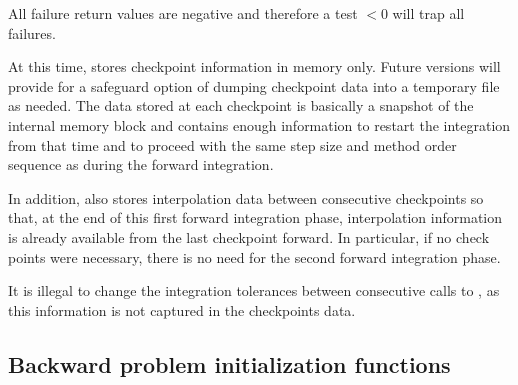 {
  All failure return values are negative and therefore a test $< 0$
  will trap all  failures.

  At this time,  stores checkpoint information in memory
  only. Future versions will provide for a safeguard option of dumping checkpoint
  data into a temporary file as needed. The data stored at each checkpoint is basically
  a snapshot of the {\idas} internal memory block and contains enough information
  to restart the integration from that time and to proceed with the same step size and
  method order sequence as during the forward integration.
  
  In addition,  also stores interpolation data between consecutive checkpoints
  so that, at the end of this first forward integration phase, interpolation information
  is already available from the last checkpoint forward. In particular,
  if no check points were necessary, there is no need for the second forward integration phase.


  {\warn}It is illegal to change the integration tolerances between consecutive calls
  to , as this information is not captured in the checkpoints data.
}  

\subsection{Backward problem initialization functions}
\label{sss:idainitb}

